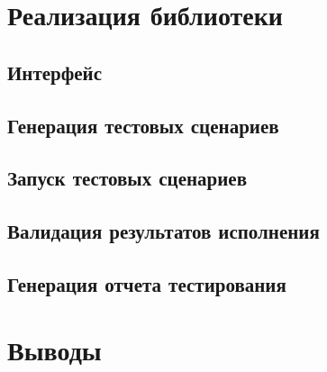 \documentclass[14pt, openany]{book}
\begin{document}
\chapter{Реализация библиотеки}

\section{Интерфейс}

\section{Генерация тестовых сценариев}

\section{Запуск тестовых сценариев}

\section{Валидация результатов исполнения}

\section{Генерация отчета тестирования}

\chapter{Выводы}



\end{document}
